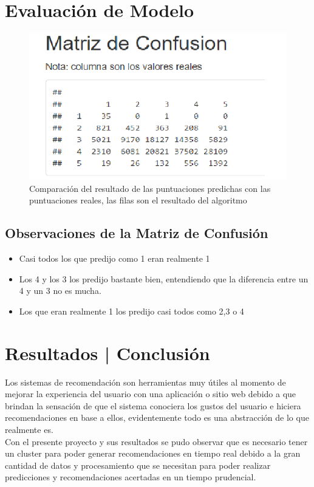 \documentclass{sciposter}
\begin{document}
\begin{multicols}{3}
\section{Evaluaci\'on de Modelo}

\begin{figure}
\begin{center}
 	\includegraphics[scale=1]{MC}
\end{center}
\caption{ Comparaci\'on del resultado de las puntuaciones predichas con las puntuaciones reales, las filas son el resultado del algoritmo }\label{fig:mc}
\end{figure}

\subsection{Observaciones de la Matriz de Confusi\'on}
\begin{itemize}
\item Casi todos los que predijo como 1 eran realmente 1
\item Los 4 y los 3 los predijo bastante bien, entendiendo que la diferencia entre un 4 y un 3 no es mucha.
\item Los que eran realmente 1 los predijo casi todos como 2,3 o 4
\end{itemize}


\section{Resultados | Conclusi\'on}

Los sistemas de recomendaci\'on son herramientas muy \'utiles al momento de mejorar la experiencia del usuario con una aplicaci\'on o sitio web debido a que brindan la sensaci\'on de que el sistema conociera los gustos del usuario e hiciera recomendaciones en base a ellos, evidentemente todo es una abstracci\'on de lo que realmente es.\\
Con el presente proyecto y sus resultados se pudo observar que es necesario tener un cluster para poder generar recomendaciones en tiempo real debido a la gran cantidad de datos y procesamiento que se necesitan para poder realizar predicciones y recomendaciones acertadas en un tiempo prudencial.\\


\end{multicols}
\end{document}
